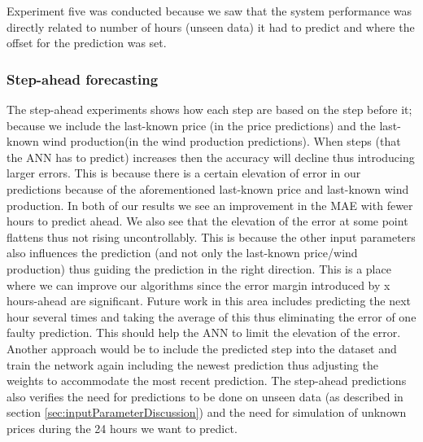 Experiment five was conducted because we saw that the system performance was directly related to number of hours (unseen data) it had to predict and where the offset for the prediction was set.
\subsubsection{Step-ahead forecasting}
\label{sec:stepAheadDiscussion}
The step-ahead experiments shows how each step are based on the step before it; because we include the last-known price (in the price predictions) and the last-known wind production(in the wind production predictions). When steps (that the ANN has to predict) increases then the accuracy will decline thus introducing larger errors. This is because there is a certain elevation of error in our predictions because of the aforementioned last-known price and last-known wind production. In both of our results we see an improvement in the MAE with fewer hours to predict ahead. We also see that the elevation of the error at some point flattens thus not rising uncontrollably. This is because the other input parameters also influences the prediction (and not only the last-known price/wind production) thus guiding the prediction in the right direction. This is a place where we can improve our algorithms since the error margin introduced by x hours-ahead are significant. Future work in this area includes predicting the next hour several times and taking the average of this thus eliminating the error of one faulty prediction. This should help the ANN to limit the elevation of the error. Another approach would be to include the predicted step into the dataset and train the network again including the newest prediction thus adjusting the weights to accommodate the most recent prediction. The step-ahead predictions also verifies the need for predictions to be done on unseen data (as described in section \ref{sec:inputParameterDiscussion}) and the need for simulation of unknown prices during the 24 hours we want to predict.

